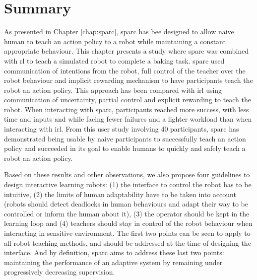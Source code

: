 \section{Summary}

As presented in Chapter \ref{chap:sparc}, \gls{sparc} has bee designed to allow naive human to teach an action policy to a robot while maintaining a constant appropriate behaviour. This chapter presents a study where \gls{sparc} was combined with \gls{rl} to teach a simulated robot to complete a baking task. \gls{sparc} used communication of intentions from the robot, full control of the teacher over the robot behaviour and implicit rewarding mechanism to have participants teach the robot an action policy. This approach has been compared with \gls{irl} using communication of uncertainty, partial control and explicit rewarding to teach the robot. When interacting with \gls{sparc}, participants reached more success, with less time and inputs and while facing fewer failures and a lighter workload than when interacting with \gls{irl}. From this user study involving 40 participants, \gls{sparc} has demonstrated being usable by naive participants to successfully teach an action policy and succeeded in its goal to enable humans to quickly and safely teach a robot an action policy.

Based on these results and other observations, we also propose four guidelines to design interactive learning robots: (1) the interface to control the robot has to be intuitive, (2) the limits of human adaptability have to be taken into account (robots should detect deadlocks in human behaviours and adapt their way to be controlled or inform the human about it), (3) the operator should be kept in the learning loop and (4) teachers should stay in control of the robot behaviour when interacting in sensitive environment. The first two points can be seen to apply to all robot teaching methods, and should be addressed at the time of designing the interface. And by definition, \gls{sparc} aims to address these last two points: maintaining the performance of an adaptive system by remaining under progressively decreasing supervision. 


